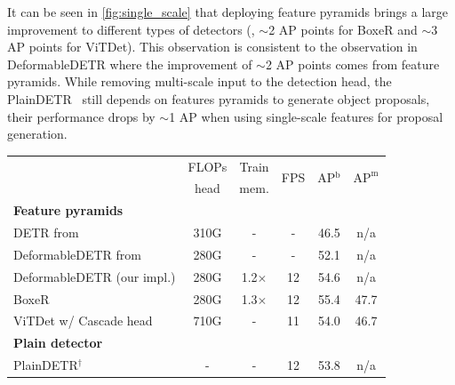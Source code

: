 It can be seen in \cref{fig:single_scale} that deploying feature pyramids brings a large improvement to different types of detectors (\ie, $\sim$2 AP points for BoxeR and $\sim$3 AP points for ViTDet). This observation is consistent to the observation in DeformableDETR \citep{zhu2021deformable} where the improvement of $\sim$2 AP points comes from feature pyramids. While removing multi-scale input to the detection head, the PlainDETR~\cite{lin2023plaindetr} still depends on features pyramids to generate object proposals, their performance drops by $\sim$1 AP when using single-scale features for proposal generation.

\begin{table}[t]
    {
    \begin{threeparttable}
    \footnotesize
    {
    \begin{tabular}{lccccc}
    \multicolumn{1}{l|}{} & \multicolumn{1}{c|}{FLOPs} & \multicolumn{1}{c|}{Train} & \multicolumn{1}{c|}{\multirow{2}{*}{FPS}} & \multicolumn{1}{c}{\multirow{2}{*}{AP$^\text{b}$}} & \multicolumn{1}{c}{\multirow{2}{*}{$\text{AP}^\text{m}$}} \\
    \multicolumn{1}{l|}{} & \multicolumn{1}{c|}{head} & \multicolumn{1}{c|}{mem.} &  \multicolumn{1}{c|}{} &  \multicolumn{1}{c}{} &  \\
    \shline
    \rowcolor{orange!75} \textbf{Feature pyramids} &  &  &  &  & \\
    \multicolumn{1}{l|}{DETR from \cite{lin2023plaindetr}} & \multicolumn{1}{c|}{310G} & \multicolumn{1}{c|}{-} & \multicolumn{1}{c|}{-} & 46.5 & n/a \\
    \multicolumn{1}{l|}{DeformableDETR from \cite{lin2023plaindetr}} & \multicolumn{1}{c|}{280G} & \multicolumn{1}{c|}{-} & \multicolumn{1}{c|}{-} & 52.1 & n/a \\
    \multicolumn{1}{l|}{DeformableDETR (our impl.)} & \multicolumn{1}{c|}{280G} & \multicolumn{1}{c|}{1.2$\times$} & \multicolumn{1}{c|}{12} & 54.6 & n/a \\
    \multicolumn{1}{l|}{BoxeR} & \multicolumn{1}{c|}{280G} & \multicolumn{1}{c|}{1.3$\times$} & \multicolumn{1}{c|}{12} & 55.4 & 47.7 \\
    \multicolumn{1}{l|}{ViTDet w/ Cascade head} & \multicolumn{1}{c|}{710G} & \multicolumn{1}{c|}{-} & \multicolumn{1}{c|}{11} & 54.0 & 46.7 \\
    \hline
    \rowcolor{orange!75} \textbf{Plain detector} &  &  &  &  & \\
    \multicolumn{1}{l|}{PlainDETR$^\dag$} & \multicolumn{1}{c|}{-} & \multicolumn{1}{c|}{-} & \multicolumn{1}{c|}{12} & 53.8 & n/a \\

\end{tabular}}
\end{threeparttable}}
\end{table}
